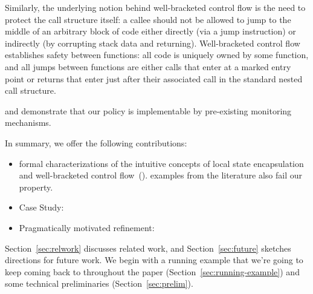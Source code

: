\documentclass[acmsmall,review,anonymous]{acmart}\settopmatter{printfolios=true,printccs=false,printacmref=false}
\begin{document}
Similarly, the underlying notion behind well-bracketed control flow is
the need to protect the call structure itself: a callee should not be
allowed to jump to the middle of an arbitrary block of code either
directly (via a jump instruction) or indirectly (by corrupting stack
data and returning). Well-bracketed control flow establishes safety between
functions: all code is uniquely owned by some function, and all jumps between functions
are either calls that enter at a marked entry point or returns that enter
just after their associated call in the standard nested call structure.


 and demonstrate that our policy is
implementable by pre-existing monitoring mechanisms. 

In summary, we offer the following contributions:
\begin{itemize}
\item {} formal characterizations of the
  intuitive concepts of local state encapsulation and well-bracketed
  control flow~().  examples from the literature also fail our
  property.
\item Case Study:
\item Pragmatically motivated refinement:
\end{itemize}
Section~\ref{sec:relwork} discusses related work, and
Section~\ref{sec:future} sketches directions for future work.
%
We begin with a running example that we're going to keep coming back
to throughout the paper (Section~\ref{sec:running-example}) and some
technical preliminaries (Section~\ref{sec:prelim}).
\end{document}
